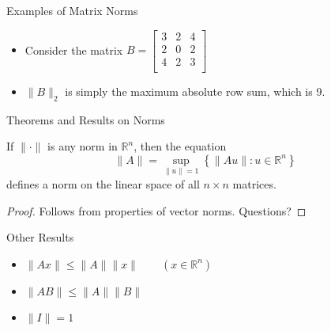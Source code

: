 \documentclass[9pt, serif]{beamer}
\newlength{\wideitemsep}
\let\olditem\item
\renewcommand{\item}{\setlength{\itemsep}{\wideitemsep}\olditem}
\newcommand{\bi}{\begin{itemize}}
\newcommand{\ei}{\end{itemize}}
\newcommand{\norm}[1]{\lVert#1\rVert}
\begin{document}
\begin{frame}{Examples of Matrix Norms}
    \bi
        \item Consider the matrix
        $B = \begin{bmatrix}
            3 & 2 & 4 \\
            2 & 0 & 2 \\
            4 & 2 & 3 \\
        \end{bmatrix}$
        \pause
        \item $\norm{B}_2$ is simply the maximum absolute row sum, which is 9.
    \ei
\end{frame}


\begin{frame}{Theorems and Results on Norms}
    \pause
    \begin{theorem}
        If $\norm{\cdot}$ is any norm in $\mathbb{R}^n$, then the equation 
        $$\norm{A} = \sup_{\norm{u}=1}\left\{\norm{Au}:u\in\mathbb{R}^n\right\}$$ defines a norm on the linear space of all $n \times n$
        matrices.
    \end{theorem} \pause
    \begin{proof}
        Follows from properties of vector norms.  Questions?
    \end{proof} \pause
    \begin{block}{Other Results}
        \bi
            \item $\norm{Ax} \le \norm{A}\norm{x} \qquad \left(x\in\mathbb{R}^n\right)$
            \item $\norm{AB} \le \norm{A}\norm{B}$
            \item $\norm{I} = 1$
        \ei
    \end{block}
\end{frame}
\end{document}
